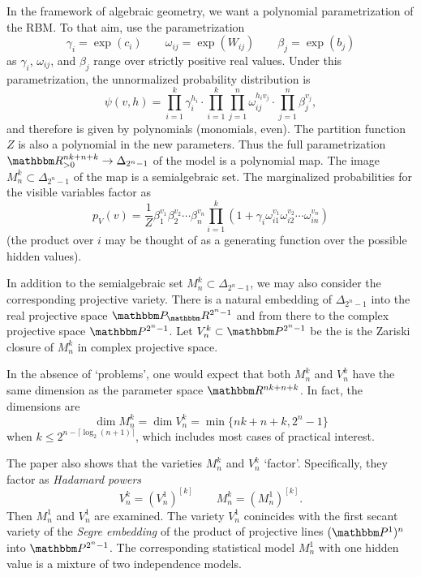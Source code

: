 \documentclass[11pt,titlepage]{article}
\begin{document}
    In the framework of algebraic geometry, we want a polynomial parametrization
    of the RBM.  To that aim, use the parametrization
    \[
        \gamma_i = \exp(c_i)
        \qquad
        \omega_{ij} = \exp(W_{ij})
        \qquad
        \beta_j = \exp(b_j)
    \]
    as $\gamma_i$, $\omega_{ij}$, and $\beta_j$ range over strictly positive
    real values.  Under this parametrization, the unnormalized probability
    distribution is
    \[
        \psi(v, h) = \prod_{i=1}^k \gamma_i^{h_i}
            \cdot 
            \prod_{i=1}^k \prod_{j=1}^n \omega_{ij}^{h_i v_j}
            \cdot
            \prod_{j=1}^n \beta_j^{v_j},
    \]
    and therefore is given by polynomials (monomials, even).  The partition
    function $Z$ is also a polynomial in the new parameters.  Thus the full
    parametrization $\R_{>0}^{nk+n+k} \to \Delta_{2^n-1}$ of the model is a
    polynomial map.  The image $M_n^k \subset \Delta_{2^n - 1}$ of the map is a
    semialgebraic set.  The marginalized probabilities for the visible variables
    factor as
    \[
        p_V(v) = \frac 1 Z
        \beta_1^{v_1} \beta_2^{v_2} \cdots \beta_n^{v_n} 
        \prod_{i=1}^k(1 +
        \gamma_i 
        \omega_{i1}^{v_1}
        \omega_{i2}^{v_2}
        \cdots
        \omega_{in}^{v_n}
        )
    \]
    (the product over $i$ may be thought of as a generating function over
    the possible hidden values).

    In addition to the semialgebraic set $M_n^k \subset \Delta_{2^n - 1}$, we
    may also consider the corresponding projective variety.  There is a natural
    embedding of $\Delta_{2^n-1}$ into the real projective space
    $\Proj_\R^{2^n-1}$ and from there to the complex projective space
    $\Proj^{2^n-1}$.  Let $V_n^k \subset \Proj^{2^n-1}$ be the is the Zariski
    closure of $M_n^k$ in complex projective space.

    In the absence of `problems', one would expect that both $M_n^k$ and $V_n^k$
    have the same dimension as the parameter space $\R^{nk + n + k}$.  In fact,
    the dimensions are
    \[
        \dim M_n^k = \dim V_n^k = \min\{nk+n+k, 2^n -1\}
    \]
    when $k \le 2^{n - \lceil \log_2(n+1) \rceil}$, which includes most cases of
    practical interest.

    The paper \cite{CMS09} also shows that the varieties $M_n^k$ and $V_n^k$
    `factor'.  Specifically, they factor as \emph{Hadamard powers}
    \[
        V_n^k = (V_n^1)^{[k]}
        \qquad
        M_n^k = (M_n^1)^{[k]}.
    \]
    Then $M_n^1$ and $V_n^1$ are examined.  The variety $V_n^1$ conincides with
    the first secant variety of the \emph{Segre embedding} of the product of
    projective lines $(\Proj^1)^n$ into $\Proj^{2^n-1}$.  The corresponding
    statistical model $M_n^1$ with one hidden value is a mixture of two
    independence models.
\end{document}
